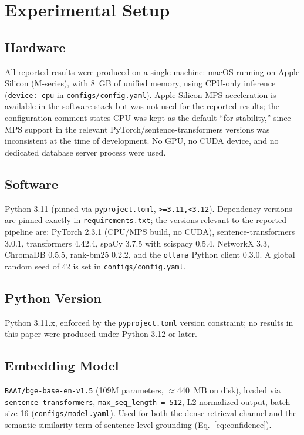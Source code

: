\documentclass[conference]{IEEEtran}
\begin{document}
\section{Experimental Setup}

\subsection{Hardware}
All reported results were produced on a single machine: macOS running on Apple Silicon (M-series), with 8~GB of unified memory, using CPU-only inference (\texttt{device: cpu} in \texttt{configs/config.yaml}). Apple Silicon MPS acceleration is available in the software stack but was not used for the reported results; the configuration comment states CPU was kept as the default ``for stability,'' since MPS support in the relevant PyTorch/sentence-transformers versions was inconsistent at the time of development. No GPU, no CUDA device, and no dedicated database server process were used.

\subsection{Software}
Python 3.11 (pinned via \texttt{pyproject.toml}, \texttt{>=3.11,<3.12}). Dependency versions are pinned exactly in \texttt{requirements.txt}; the versions relevant to the reported pipeline are: PyTorch 2.3.1 (CPU/MPS build, no CUDA), sentence-transformers 3.0.1, transformers 4.42.4, spaCy 3.7.5 with scispacy 0.5.4, NetworkX 3.3, ChromaDB 0.5.5, rank-bm25 0.2.2, and the \texttt{ollama} Python client 0.3.0. A global random seed of 42 is set in \texttt{configs/config.yaml}.

\subsection{Python Version}
Python 3.11.x, enforced by the \texttt{pyproject.toml} version constraint; no results in this paper were produced under Python 3.12 or later.

\subsection{Embedding Model}
\texttt{BAAI/bge-base-en-v1.5} (109M parameters, $\approx$440~MB on disk), loaded via \texttt{sentence-transformers}, \texttt{max\_seq\_length = 512}, L2-normalized output, batch size 16 (\texttt{configs/model.yaml}). Used for both the dense retrieval channel and the semantic-similarity term of sentence-level grounding (Eq.~\ref{eq:confidence}).
\end{document}
